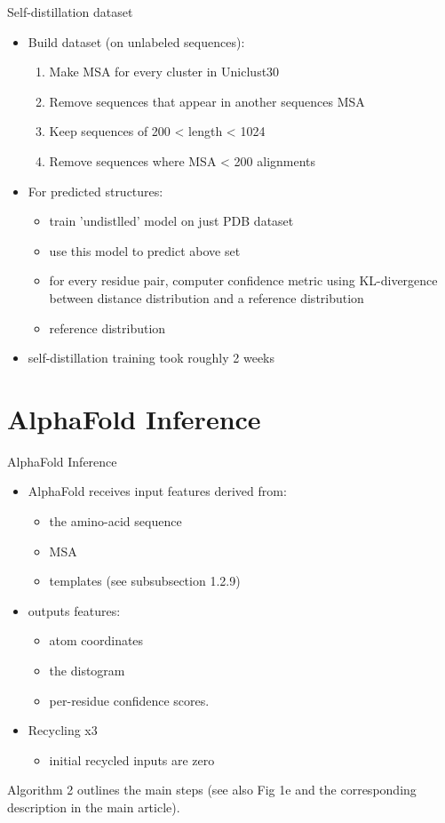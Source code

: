 \documentclass[presentation, smaller]{beamer}
\begin{document}
\begin{frame}[label={sec:orga51b4f4}]{Self-distillation dataset \cite{jumperHighlyAccurateProtein2021}}
\begin{itemize}
\item Build dataset (on unlabeled sequences):
\begin{enumerate}
\item Make MSA for every cluster in Uniclust30
\item Remove sequences that appear in another sequences MSA
\item Keep sequences of 200 < length < 1024
\item Remove sequences where MSA < 200 alignments
\end{enumerate}
\item For predicted structures:
\begin{itemize}
\item train 'undistlled' model on just PDB dataset
\item use this model to predict above set
\item for every residue pair, computer confidence metric using KL-divergence between distance distribution and a reference distribution
\item reference distribution
\end{itemize}
\item self-distillation training took roughly 2 weeks
\end{itemize}
\end{frame}

\section*{AlphaFold Inference}
\label{sec:orgb517554}
\begin{frame}[label={sec:org47c1339}]{AlphaFold Inference \cite{jumperHighlyAccurateProtein2021}}
\begin{itemize}
\item AlphaFold receives input features derived from:
\begin{itemize}
\item the amino-acid sequence
\item MSA
\item templates (see subsubsection 1.2.9)
\end{itemize}
\item outputs features:
\begin{itemize}
\item atom coordinates
\item the distogram
\item per-residue confidence scores.
\end{itemize}
\item Recycling x3
\begin{itemize}
\item initial recycled inputs are zero
\end{itemize}
\end{itemize}

Algorithm 2 outlines the main steps (see also Fig 1e and the corresponding description in the main article).
\end{frame}
\end{document}
